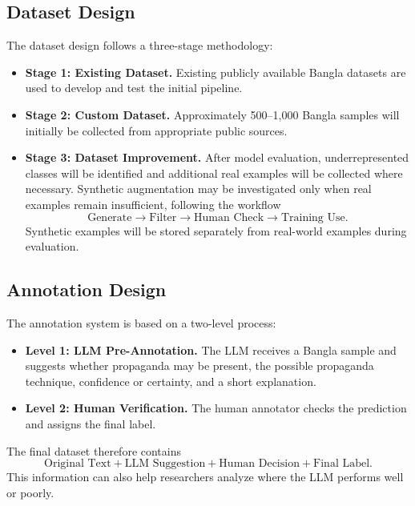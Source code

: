 \documentclass[12pt,a4paper]{report}
\begin{document}
\subsection{Dataset Design}
The dataset design follows a three-stage methodology:
\begin{itemize}
  \item \textbf{Stage 1: Existing Dataset.} Existing publicly available Bangla
        datasets are used to develop and test the initial pipeline.
  \item \textbf{Stage 2: Custom Dataset.} Approximately 500--1,000 Bangla samples
        will initially be collected from appropriate public sources.
  \item \textbf{Stage 3: Dataset Improvement.} After model evaluation,
        underrepresented classes will be identified and additional real examples
        will be collected where necessary. Synthetic augmentation may be
        investigated only when real examples remain insufficient, following the
        workflow
        \[\text{Generate}\rightarrow\text{Filter}\rightarrow\text{Human Check}\rightarrow\text{Training Use}.\]
        Synthetic examples will be stored separately from real-world examples
        during evaluation.
\end{itemize}

\subsection{Annotation Design}
The annotation system is based on a two-level process:
\begin{itemize}
  \item \textbf{Level 1: LLM Pre-Annotation.} The LLM receives a Bangla sample and
        suggests whether propaganda may be present, the possible propaganda
        technique, confidence or certainty, and a short explanation.
  \item \textbf{Level 2: Human Verification.} The human annotator checks the
        prediction and assigns the final label.
\end{itemize}
The final dataset therefore contains
\[\text{Original Text}+\text{LLM Suggestion}+\text{Human Decision}+\text{Final Label}.\]
This information can also help researchers analyze where the LLM performs well or
poorly.
\end{document}

